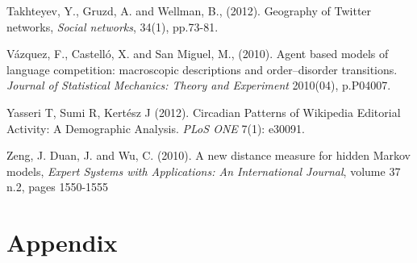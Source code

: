 \documentclass[12pt]{article}
\begin{document}
\begin{thebibliography}{9}
Takhteyev, Y., Gruzd, A. and Wellman, B., (2012). Geography of Twitter networks, \textit{Social networks}, 34(1), pp.73-81.

Vázquez, F., Castell\'o, X. and San Miguel, M., (2010). Agent based models of language competition: macroscopic descriptions and order–disorder transitions. \textit{Journal of Statistical Mechanics: Theory and Experiment} 2010(04), p.P04007.

Yasseri T, Sumi R, Kert\'esz J (2012). Circadian Patterns of Wikipedia Editorial Activity: A Demographic Analysis. \textit{PLoS ONE} 7(1): e30091.

Zeng, J. Duan, J. and Wu, C. (2010). A new distance measure for hidden Markov models, \textit{Expert Systems with Applications: An International Journal}, volume 37 n.2, pages 1550-1555


\end{thebibliography}
\newpage
\section{Appendix}

\end{document}
